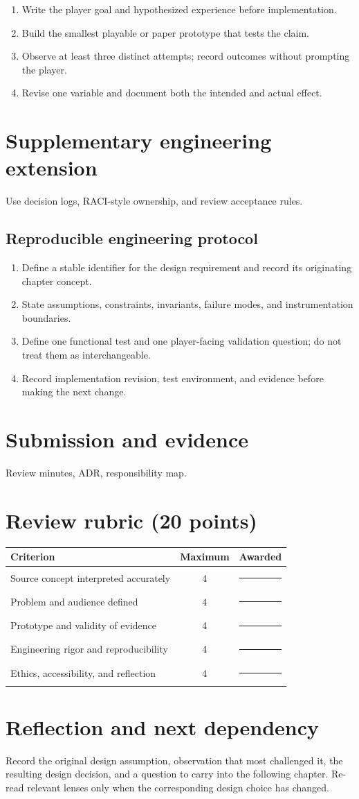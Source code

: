 \documentclass[11pt]{article}
\begin{document}
\begin{enumerate}
\item Write the player goal and hypothesized experience before implementation.
\item Build the smallest playable or paper prototype that tests the claim.
\item Observe at least three distinct attempts; record outcomes without prompting the player.
\item Revise one variable and document both the intended and actual effect.
\end{enumerate}

\section{Supplementary engineering extension}
Use decision logs, RACI-style ownership, and review acceptance rules.


\subsection{Reproducible engineering protocol}
\begin{enumerate}
\item Define a stable identifier for the design requirement and record its originating chapter concept.
\item State assumptions, constraints, invariants, failure modes, and instrumentation boundaries.
\item Define one functional test and one player-facing validation question; do not treat them as interchangeable.
\item Record implementation revision, test environment, and evidence before making the next change.
\end{enumerate}

\section{Submission and evidence}
Review minutes, ADR, responsibility map.


\section{Review rubric (20 points)}
\begin{tabularx}{\linewidth}{@{}Xcc@{}}\toprule
Criterion & Maximum & Awarded \\ \midrule
Source concept interpreted accurately & 4 & \rule{0.45in}{0.4pt}\\
Problem and audience defined & 4 & \rule{0.45in}{0.4pt}\\
Prototype and validity of evidence & 4 & \rule{0.45in}{0.4pt}\\
Engineering rigor and reproducibility & 4 & \rule{0.45in}{0.4pt}\\
Ethics, accessibility, and reflection & 4 & \rule{0.45in}{0.4pt}\\\bottomrule
\end{tabularx}

\section{Reflection and next dependency}
Record the original design assumption, observation that most challenged it, the resulting design decision, and a question to carry into the following chapter. Re-read relevant lenses only when the corresponding design choice has changed.
\end{document}
